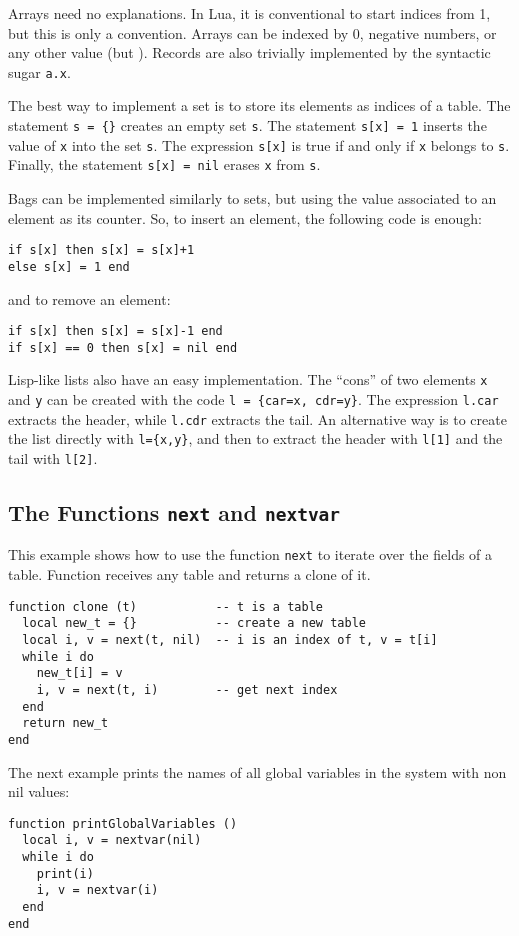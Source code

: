 Arrays need no explanations.
In Lua, it is conventional to start indices from 1,
but this is only a convention.
Arrays can be indexed by 0, negative numbers, or any other value (but \nil).
Records are also trivially implemented by the syntactic sugar
\verb'a.x'.

The best way to implement a set is to store
its elements as indices of a table.
The statement \verb's = {}' creates an empty set \verb's'. 
The statement \verb's[x] = 1' inserts the value of \verb'x' into
the set \verb's'.
The expression \verb's[x]' is true if and only if
\verb'x' belongs to \verb's'.
Finally, the statement \verb's[x] = nil' erases \verb'x' from \verb's'.

Bags can be implemented similarly to sets,
but using the value associated to an element as its counter.
So, to insert an element, 
the following code is enough:
\begin{verbatim}
if s[x] then s[x] = s[x]+1
else s[x] = 1 end
\end{verbatim}
and to remove an element:
\begin{verbatim}
if s[x] then s[x] = s[x]-1 end
if s[x] == 0 then s[x] = nil end
\end{verbatim}

Lisp-like lists also have an easy implementation.
The ``cons'' of two elements \verb'x' and \verb'y' can be
created with the code \verb'l = {car=x, cdr=y}'.
The expression \verb'l.car' extracts the header, 
while \verb'l.cdr' extracts the tail.
An alternative way is to create the list directly with \verb'l={x,y}',
and then to extract the header with \verb'l[1]' and
the tail with \verb'l[2]'.

\subsection{The Functions {\tt next} and {\tt nextvar}} \label{exnext}
This example shows how to use the function \verb'next' to iterate
over the fields of a table.
Function  receives any table and returns a clone of it.
\begin{verbatim}
function clone (t)           -- t is a table
  local new_t = {}           -- create a new table
  local i, v = next(t, nil)  -- i is an index of t, v = t[i]
  while i do
    new_t[i] = v
    i, v = next(t, i)        -- get next index
  end
  return new_t
end
\end{verbatim}

The next example prints the names of all global variables
in the system with non nil values:
\begin{verbatim}
function printGlobalVariables ()
  local i, v = nextvar(nil)
  while i do
    print(i)
    i, v = nextvar(i)
  end
end
\end{verbatim}


